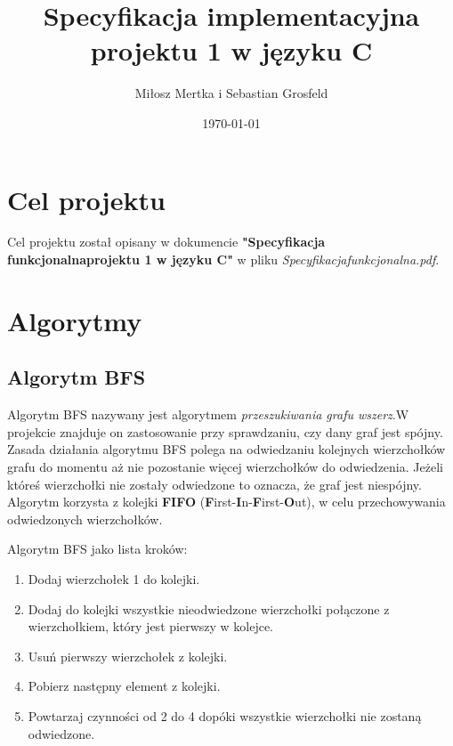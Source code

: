 \documentclass{article}
\title{Specyfikacja implementacyjna projektu 1 w języku C}
\author{Miłosz Mertka i Sebastian Grosfeld}
\date{\today}
\begin{document}
\maketitle

\tableofcontents

\newpage

\setlength{\headheight}{23pt}

\section{Cel projektu}
Cel projektu został opisany w dokumencie \textbf{"Specyfikacja funkcjonalna\linebreak projektu 1 w języku C"} w pliku \emph{Specyfikacja\textunderscore funkcjonalna.pdf}.

\section{Algorytmy}
\subsection{Algorytm BFS}
Algorytm BFS nazywany jest algorytmem \emph{przeszukiwania grafu wszerz}.\linebreak W projekcie znajduje on zastosowanie przy sprawdzaniu, czy dany graf jest spójny. Zasada działania algorytmu BFS polega na odwiedzaniu kolejnych wierzchołków grafu do momentu aż nie pozostanie więcej wierzchołków do odwiedzenia. Jeżeli któreś wierzchołki nie zostały odwiedzone to oznacza, że graf jest niespójny. Algorytm korzysta z kolejki \textbf{FIFO} (\textbf{F}irst-\textbf{I}n-\textbf{F}irst-\textbf{O}ut), w celu przechowywania odwiedzonych wierzchołków.

\medskip

\noindent Algorytm BFS jako lista kroków:
\begin{enumerate}
    \item Dodaj wierzchołek 1 do kolejki.
    \item Dodaj do kolejki wszystkie nieodwiedzone wierzchołki połączone z wierzchołkiem, który jest pierwszy w kolejce.
    \item Usuń pierwszy wierzchołek z kolejki.
    \item Pobierz następny element z kolejki.
    \item Powtarzaj czynności od 2 do 4 dopóki wszystkie wierzchołki nie zostaną odwiedzone.
\end{enumerate}
\end{document}
